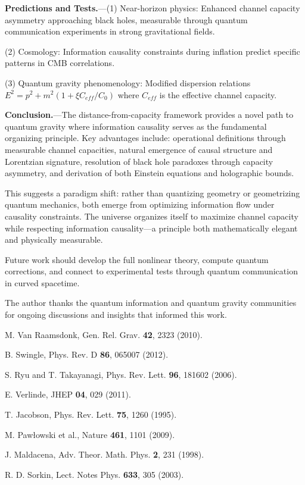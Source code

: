 \documentclass[aps,prl,twocolumn,showpacs,superscriptaddress,groupedaddress]{revtex4-2}
\begin{document}
\textbf{Predictions and Tests.}---(1) Near-horizon physics: Enhanced channel capacity asymmetry approaching black holes, measurable through quantum communication experiments in strong gravitational fields.

(2) Cosmology: Information causality constraints during inflation predict specific patterns in CMB correlations.

(3) Quantum gravity phenomenology: Modified dispersion relations $E^2 = p^2 + m^2(1 + \xi C_{eff}/C_0)$ where $C_{eff}$ is the effective channel capacity.

\textbf{Conclusion.}---The distance-from-capacity framework provides a novel path to quantum gravity where information causality serves as the fundamental organizing principle. Key advantages include: operational definitions through measurable channel capacities, natural emergence of causal structure and Lorentzian signature, resolution of black hole paradoxes through capacity asymmetry, and derivation of both Einstein equations and holographic bounds.

This suggests a paradigm shift: rather than quantizing geometry or geometrizing quantum mechanics, both emerge from optimizing information flow under causality constraints. The universe organizes itself to maximize channel capacity while respecting information causality—a principle both mathematically elegant and physically measurable.

Future work should develop the full nonlinear theory, compute quantum corrections, and connect to experimental tests through quantum communication in curved spacetime.

\acknowledgments
The author thanks the quantum information and quantum gravity communities for ongoing discussions and insights that informed this work.

\begin{thebibliography}{99}

M. Van Raamsdonk, Gen. Rel. Grav. \textbf{42}, 2323 (2010).

B. Swingle, Phys. Rev. D \textbf{86}, 065007 (2012).

S. Ryu and T. Takayanagi, Phys. Rev. Lett. \textbf{96}, 181602 (2006).

E. Verlinde, JHEP \textbf{04}, 029 (2011).

T. Jacobson, Phys. Rev. Lett. \textbf{75}, 1260 (1995).

M. Pawłowski et al., Nature \textbf{461}, 1101 (2009).

J. Maldacena, Adv. Theor. Math. Phys. \textbf{2}, 231 (1998).

R. D. Sorkin, Lect. Notes Phys. \textbf{633}, 305 (2003).

\end{thebibliography}
\end{document}
